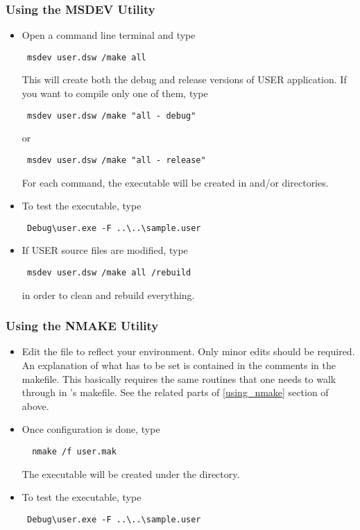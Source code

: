 \subsubsection{Using the MSDEV Utility}
\begin{itemize}
\item Open a command line terminal and type
{\color{Brown}
\begin{verbatim}
 msdev user.dsw /make all
\end{verbatim}
}
This will create both the debug and release versions of USER application. 
If you want to compile only one of them, type
{\color{Brown}
\begin{verbatim}
 msdev user.dsw /make "all - debug"
\end{verbatim}
}
or 
{\color{Brown}
\begin{verbatim}
 msdev user.dsw /make "all - release"
\end{verbatim}
}
For each command, the executable  will be created in 
 and/or 
directories. 

\item To test the executable, type 
{\color{Brown}
\begin{verbatim}
 Debug\user.exe -F ..\..\sample.user
\end{verbatim}
}
\item If USER source files are modified, type 
{\color{Brown}
\begin{verbatim}
 msdev user.dsw /make all /rebuild
\end{verbatim}
}
in order to clean and rebuild everything.
\end{itemize} 

\subsubsection{Using the NMAKE Utility}

\begin{itemize}
\item 
Edit the file  to reflect your environment. 
Only minor edits should be required. An explanation of 
what has to be set is contained in the comments in the makefile. 
This basically 
requires the same routines that one needs to walk through in 
's makefile. 
See the related parts of \ref{using_nmake} section 
of  above.

\item Once configuration is done, type 
{\color{Brown}
\begin{verbatim}
  nmake /f user.mak
\end{verbatim}
}
The executable  will be created under the 
 directory.
\item To test the executable, type 
{\color{Brown}
\begin{verbatim}
 Debug\user.exe -F ..\..\sample.user
\end{verbatim}
}
\end{itemize}


